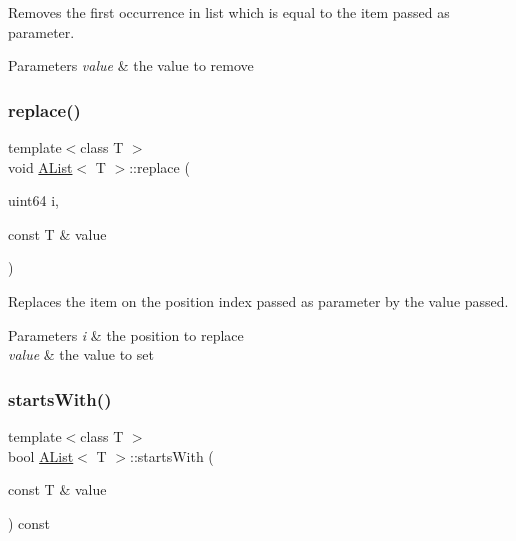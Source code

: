 Removes the first occurrence in list which is equal to the item passed as parameter. 


\begin{DoxyParams}{Parameters}
{\em value} & the value to remove \\
\hline
\end{DoxyParams}
\mbox{\label{class_a_list_a745c812c22b1a3a8efdbe82eafd86f4b}} 
\subsubsection{\texorpdfstring{replace()}{replace()}}
{\footnotesize\ttfamily template$<$class T $>$ \\
void \mbox{\hyperlink{class_a_list}{A\+List}}$<$ T $>$\+::replace (\begin{DoxyParamCaption}\item[{uint64}]{i,  }\item[{const T \&}]{value }\end{DoxyParamCaption})}



Replaces the item on the position index passed as parameter by the value passed. 


\begin{DoxyParams}{Parameters}
{\em i} & the position to replace \\
\hline
{\em value} & the value to set \\
\hline
\end{DoxyParams}
\mbox{\label{class_a_list_ac6b1d6dabb7177aa465019860aeacba1}} 
\subsubsection{\texorpdfstring{startsWith()}{startsWith()}}
{\footnotesize\ttfamily template$<$class T $>$ \\
bool \mbox{\hyperlink{class_a_list}{A\+List}}$<$ T $>$\+::starts\+With (\begin{DoxyParamCaption}\item[{const T \&}]{value }\end{DoxyParamCaption}) const}



